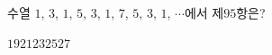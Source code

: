 \hspace*{2mm}\begin{minipage}[t]{\dimexpr\linewidth-2mm\relax}\vspace{0pt}
수열 $1$, $3$, $1$, $5$, $3$, $1$, $7$, $5$, $3$, $1$, $\cdots$에서 제$95$항은?
\begin{choices32}{$19$}{$21$}{$23$}{$25$}{$27$}\end{choices32}\end{minipage}
